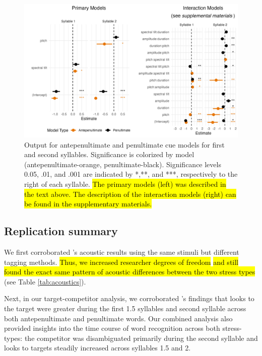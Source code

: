 \begin{figure}[H]
  \centering
    \includegraphics[width=1\linewidth]{visuals/combined_plot_o_n.jpeg} %

  \caption{Output for antepenultimate and penultimate cue models for first and second syllables. Significance is colorized by model (antepenultimate-orange, penultimate-black). Significance levels 0.05, .01, and .001 are indicated by *,**, and ***, respectively to the right of each syllable. \hl{The primary models (left) was described in the text above. The description of the interaction models (right) can be found in the supplementary materials.}}
  \label{fig:analysis_3_plot}
\end{figure}

\subsection{Replication summary}
We first corroborated \cite{Sulpizio_McQueen_2012}'s acoustic results using the same stimuli but different tagging methods. \hl{Thus, we increased researcher degrees of freedom} \citep{Corretta2023} \hl{and still  found the exact same pattern of acoustic differences between the two stress types} (see Table \ref{tab:acoustics}).

Next, in our target-competitor analysis, we corroborated \cite{Sulpizio_McQueen_2012}'s findings that looks to the target were greater during the first 1.5 syllables and second syllable across both antepenultimate and penultimate words. Our combined analysis also provided insights into the time course of word recognition across both stress-types: the competitor was disambiguated primarily during the second syllable and looks to targets steadily increased across syllables 1.5 and 2.

